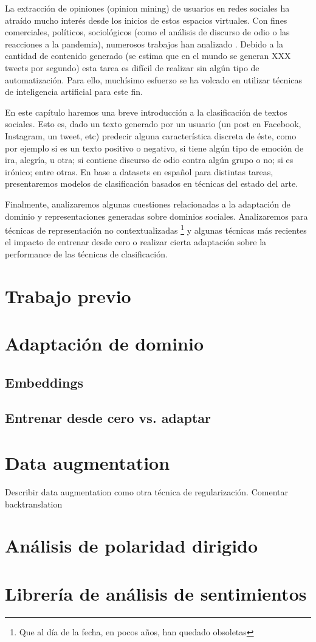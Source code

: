 La extracción de opiniones (opinion mining) de usuarios en redes sociales ha atraído mucho interés desde los inicios de estos espacios virtuales. Con fines comerciales, políticos, sociológicos (como el análisis de discurso de odio o las reacciones a la pandemia), numerosos trabajos han analizado . Debido a la cantidad de contenido generado (se estima que en el mundo se generan XXX tweets por segundo) esta tarea es difícil de realizar sin algún tipo de automatización. Para ello, muchísimo esfuerzo se ha volcado en utilizar técnicas de inteligencia artificial para este fin.

En este capítulo haremos una breve introducción a la clasificación de textos sociales. Esto es, dado un texto generado por un usuario (un post en Facebook, Instagram, un tweet, etc) predecir alguna característica discreta de éste, como por ejemplo si es un texto positivo o negativo, si tiene algún tipo de emoción de ira, alegría, u otra; si contiene discurso de odio contra algún grupo o no; si es irónico; entre otras. En base a datasets en español para distintas tareas, presentaremos modelos de clasificación basados en técnicas del estado del arte.

Finalmente, analizaremos algunas cuestiones relacionadas a la adaptación de dominio y representaciones generadas sobre dominios sociales. Analizaremos para técnicas de representación no contextualizadas \footnote{Que al día de la fecha, en pocos años, han quedado obsoletas} y algunas técnicas más recientes el impacto de entrenar desde cero o realizar cierta adaptación sobre la performance de las técnicas de clasificación.

\section{Trabajo previo}

\section{Adaptación de dominio}

\subsection{Embeddings}
\subsection{Entrenar desde cero vs. adaptar}

\section{Data augmentation}

Describir data augmentation como otra técnica de regularización. Comentar backtranslation

\section{Análisis de polaridad dirigido}

\section{Librería de análisis de sentimientos}
